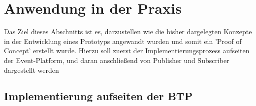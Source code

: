 \section{Anwendung in der Praxis}

\label{implementierung}
  Das Ziel dieses Abschnitts ist es, darzustellen wie die bisher dargelegten Konzepte in der Entwicklung eines Prototyps angewandt wurden und somit ein 'Proof of Concept' erstellt wurde. Hierzu soll zuerst der Implementierungsprozess aufseiten der Event-Platform, und daran anschließend von Publisher und Subscriber dargestellt werden\\

  \subsection{Implementierung aufseiten der BTP}
  

